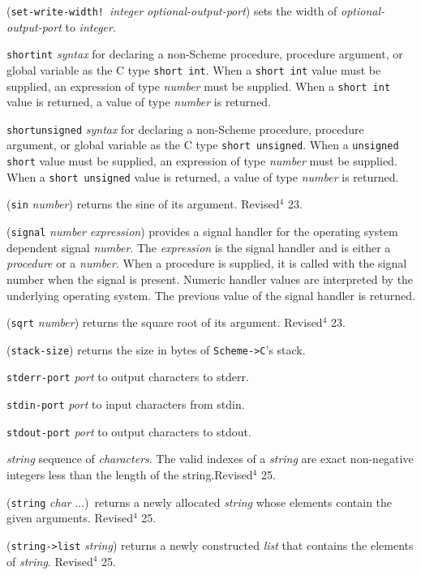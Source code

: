 \documentclass[10pt,twocolumn]{article}
\begin{document}
(\texttt{set-write-width!}\ \emph{integer} \emph{optional-output-port}) sets the
width of \emph{optional-output-port} to \emph{integer}.

\texttt{shortint} \emph{syntax} for declaring a non-Scheme procedure,
procedure argument, or global variable as the C type \texttt{short int}.
When a \texttt{short int} value must be supplied, an expression of type
\emph{number} must be supplied.  When a \texttt{short int} value is returned,
a value of type \emph{number} is returned.

\texttt{shortunsigned} \emph{syntax} for declaring a non-Scheme procedure,
procedure argument, or global variable as the C type \texttt{short
unsigned}. When a \texttt{unsigned short} value must be supplied, an
expression of type \emph{number} must be supplied.  When a \texttt{short
unsigned} value is returned, a value of type \emph{number} is returned.

(\texttt{sin} \emph{number}) returns the sine of its argument.  Revised$^4$
23.

(\texttt{signal} \emph{number} \emph{expression}) provides a signal handler for
the operating system dependent signal \emph{number}.  The \emph{expression} is the
signal handler and is either a \emph{procedure} or a \emph{number}.  When a
procedure is supplied, it is called with the signal number when the
signal is present.  Numeric handler values are interpreted by the
underlying operating system.  The previous value of the signal
handler is returned.

(\texttt{sqrt} \emph{number}) returns the square root of its argument.
Revised$^4$ 23.  

(\texttt{stack-size}) returns the size in bytes of \texttt{Scheme->C}'s stack.

\texttt{stderr-port} \emph{port} to output characters to stderr.

\texttt{stdin-port} \emph{port} to input characters from stdin.

\texttt{stdout-port} \emph{port} to output characters to stdout.

\emph{string} sequence of \emph{characters}.  The valid indexes of a
\emph{string} are exact non-negative integers less than the
length of the string.Revised$^4$ 25.

(\texttt{string} \emph{char} ...)\ returns a newly allocated
\emph{string} whose elements contain the given arguments.  Revised$^4$ 25.

(\texttt{string->list} \emph{string}) returns a newly constructed \emph{list}
that contains the elements of \emph{string}.  Revised$^4$ 25.
\end{document}
